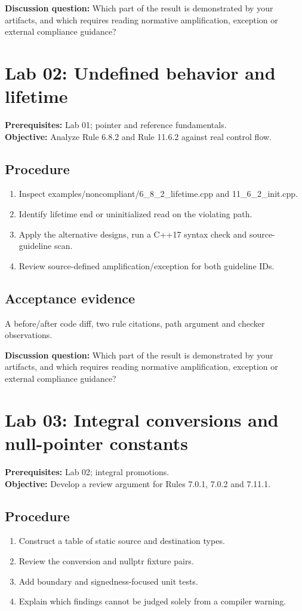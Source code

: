 \documentclass[10pt,letterpaper]{article}
\begin{document}
\textbf{Discussion question:} Which part of the result is demonstrated by your artifacts, and which requires reading normative amplification, exception or external compliance guidance?\par

\section{Lab 02: Undefined behavior and lifetime}
\textbf{Prerequisites:} Lab 01; pointer and reference fundamentals.\\\textbf{Objective:} Analyze Rule 6.8.2 and Rule 11.6.2 against real control flow.

\subsection{Procedure}
\begin{enumerate}
\item Inspect examples/noncompliant/6\_8\_2\_lifetime.cpp and 11\_6\_2\_init.cpp.
\item Identify lifetime end or uninitialized read on the violating path.
\item Apply the alternative designs, run a C++17 syntax check and source-guideline scan.
\item Review source-defined amplification/exception for both guideline IDs.
\end{enumerate}

\subsection{Acceptance evidence}
A before/after code diff, two rule citations, path argument and checker observations.

\textbf{Discussion question:} Which part of the result is demonstrated by your artifacts, and which requires reading normative amplification, exception or external compliance guidance?\par

\section{Lab 03: Integral conversions and null-pointer constants}
\textbf{Prerequisites:} Lab 02; integral promotions.\\\textbf{Objective:} Develop a review argument for Rules 7.0.1, 7.0.2 and 7.11.1.

\subsection{Procedure}
\begin{enumerate}
\item Construct a table of static source and destination types.
\item Review the conversion and nullptr fixture pairs.
\item Add boundary and signedness-focused unit tests.
\item Explain which findings cannot be judged solely from a compiler warning.
\end{enumerate}
\end{document}
